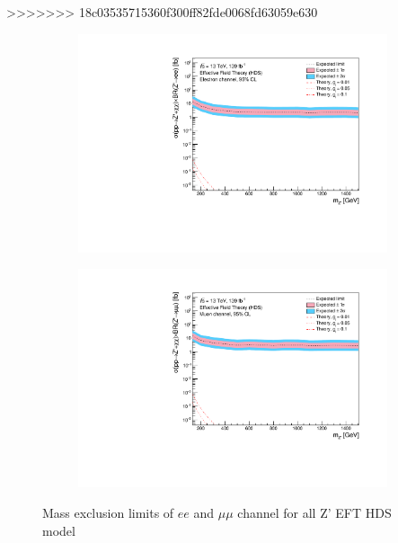 \documentclass[12pt, a4paper]{book}
\begin{document}
>>>>>>> 18c03535715360f300ff82fde0068fd63059e630
\begin{figure}[!ht]
	\centering
   \begin{subfigure}[b]{0.49\textwidth}
      \centering
      \includegraphics[width=1\textwidth]{Limits/EFT_HDS/mass_exclusion_ee.pdf}
      \end{subfigure}
   \hfill
   \begin{subfigure}[b]{0.49\textwidth}
      \centering
      \includegraphics[width=1\textwidth]{Limits/EFT_HDS/mass_exclusion_uu.pdf}
      \end{subfigure}
   \caption{Mass exclusion limits of $ee$ and $\mu\mu$ channel for all Z' EFT HDS model}\label{fig:EFT_HDS_exclusion_ee_uu}
\end{figure}
\clearpage
\end{document}
